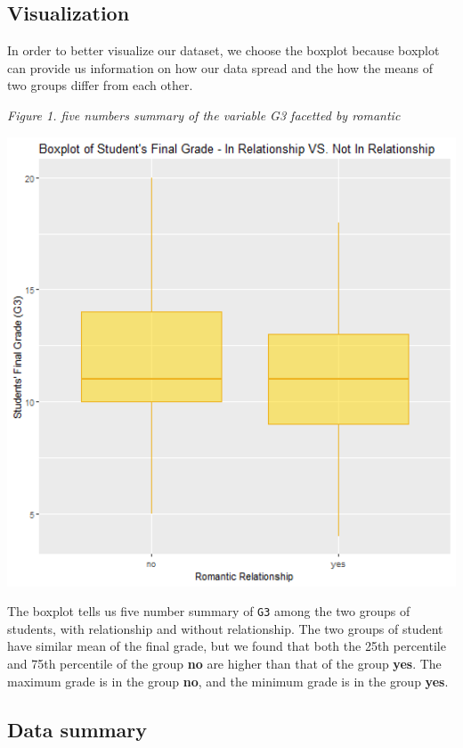 \documentclass[]{article}
\begin{document}
\subsection{Visualization}\label{visualization}

In order to better visualize our dataset, we choose the boxplot because
boxplot can provide us information on how our data spread and the how
the means of two groups differ from each other.

\emph{Figure 1. five numbers summary of the variable G3 facetted by
romantic}

\includegraphics[width=6.67in]{../results/boxplot}

The boxplot tells us five number summary of \texttt{G3} among the two
groups of students, with relationship and without relationship. The two
groups of student have similar mean of the final grade, but we found
that both the 25th percentile and 75th percentile of the group
\textbf{no} are higher than that of the group \textbf{yes}. The maximum
grade is in the group \textbf{no}, and the minimum grade is in the group
\textbf{yes}.

\subsection{Data summary}\label{data-summary}
\end{document}
